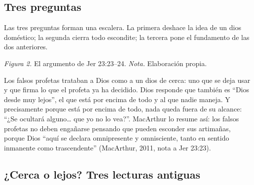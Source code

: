 \documentclass[11pt,letterpaper]{article}
\begin{document}
\subsection{Tres preguntas}

Las tres preguntas forman una escalera. La primera deshace la idea de un dios doméstico; la segunda cierra todo escondite; la tercera pone el fundamento de las dos anteriores.

\begin{center}
\par
{\footnotesize\color{gris}\textit{Figura 2.} El argumento de Jer 23:23--24. \textit{Nota.} Elaboración propia.}
\end{center}

Los falsos profetas trataban a Dios como a un dios de cerca: uno que se deja usar y que firma lo que el profeta ya ha decidido. Dios responde que también es ``Dios desde muy lejos'', el que está por encima de todo y al que nadie maneja. Y precisamente porque está por encima de todo, nada queda fuera de su alcance: ``¿Se ocultará alguno\ldots{} que yo no lo vea?''. MacArthur lo resume así: los falsos profetas no deben engañarse pensando que pueden esconder sus artimañas, porque Dios ``aquí se declara omnipresente y omnisciente, tanto en sentido inmanente como trascendente'' (MacArthur, 2011, nota a Jer 23:23).

\subsection{¿Cerca o lejos? Tres lecturas antiguas}
\end{document}
